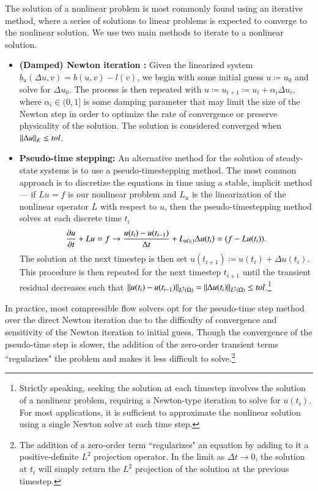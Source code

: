 The solution of a nonlinear problem is most commonly found using an iterative method, where a series of solutions to linear problems is expected to converge to the nonlinear solution.  We use two main methods to iterate to a nonlinear solution.  
\begin{itemize}
\item{} \textbf{(Damped) Newton iteration :} Given the linearized system $b_u(\Delta u,v) = b(u,v)-l(v)$, we begin with some initial guess $u\coloneqq u_0$ and solve for $\Delta u_0$.  The process is then repeated with $u\coloneqq u_{i+1} \coloneqq u_i + \alpha_i \Delta u_i$, where $\alpha_i \in (0,1]$ is some damping parameter that may limit the size of the Newton step in order to optimize the rate of convergence or preserve physicality of the solution.  The solution is considered converged when $\nor{\Delta u}_E \leq tol$.  
\item{} \textbf{Pseudo-time stepping: } An alternative method for the solution of steady-state systems is to use a pseudo-timestepping method.  The most common approach is to discretize the equations in time using a stable, implicit method --- if $Lu = f$ is our nonlinear problem and $L_u$ is the linearization of the nonlinear operator $L$ with respect to $u$, then the pseudo-timestepping method solves at each discrete time $t_{i}$
\[
\pd{u}{t} + Lu = f \rightarrow \frac{u(t_i) - u(t_{i-1})}{\Delta t} + L_{u(t_i)}\Delta u(t_i) = (f - Lu(t_i)).
\]
The solution at the next timestep is then set $u(t_{i+1}) \coloneqq u(t_i) + \Delta u(t_i)$.  This procedure is then repeated for the next timestep $t_{i+1}$ until the transient residual decreases such that $\nor{u(t_i) - u(t_{i-1})}_{L^2(\Omega)} = \nor{\Delta u(t_i)}_{L^2(\Omega)} \leq tol$.\footnote{Strictly speaking, seeking the solution at each timestep involves the solution of a nonlinear problem, requiring a Newton-type iteration to solve for $u(t_i)$.  For most applications, it is sufficient to approximate the nonlinear solution using a single Newton solve at each time step.} 
\end{itemize}

In practice, most compressible flow solvers opt for the pseudo-time step method over the direct Newton iteration due to the difficulty of convergence and sensitivity of the Newton iteration to initial guess\cite{libMeshPaper, gunzburger1989finite}.  Though the convergence of the pseudo-time step is slower, the addition of the zero-order transient terms ``regularizes" the problem and makes it less difficult to solve.\footnote{The addition of a zero-order term ``regularizes" an equation by adding to it a positive-definite $L^2$ projection operator.  In the limit as $\Delta t\rightarrow 0$, the solution at $t_i$ will simply return the $L^2$ projection of the solution at the previous timestep.}

